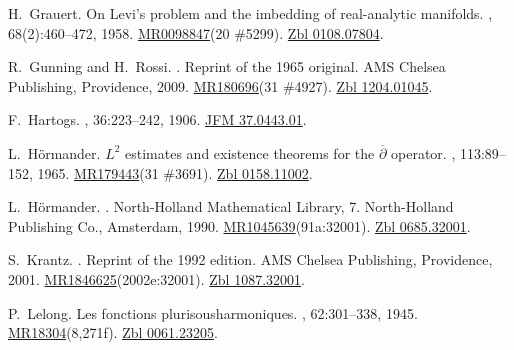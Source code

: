 \documentclass[11pt,a4paper, final, twoside]{article}
\numberwithin{equation}{section}
\begin{document}
\begin{thebibliography}{10}
H.~Grauert.
\newblock On {L}evi's problem and the imbedding of real-analytic manifolds.
, 68(2):460--472, 1958.
\newblock \href{http://www.ams.org/mathscinet-getitem?mr=0098847}{MR0098847}(20
  \#5299). \href{http://zbmath.org/?q=an:0108.07804}{Zbl 0108.07804}.

R.~Gunning and H.~Rossi.
.
\newblock Reprint of the 1965 original. AMS Chelsea Publishing, Providence,
  2009.
\newblock \href{http://www.ams.org/mathscinet-getitem?mr=180696}{MR180696}(31
  \#4927). \href{http://zbmath.org/?q=an:1204.01045}{Zbl 1204.01045}.

F.~Hartogs.
,
  36:223--242, 1906.
\newblock \href{http://zbmath.org/?q=an:37.0443.01}{JFM 37.0443.01}.

L.~H\"ormander.
\newblock ${L}^2$ estimates and existence theorems for the $\overline\partial$
  operator.
, 113:89--152, 1965.
\newblock \href{http://www.ams.org/mathscinet-getitem?mr=179443}{MR179443}(31
  \#3691). \href{http://zbmath.org/?q=an:0158.11002}{Zbl 0158.11002}.

L.~H{\"o}rmander.
.
\newblock North-Holland Mathematical Library, 7. North-Holland Publishing Co.,
  Amsterdam, 1990.
\newblock
  \href{http://www.ams.org/mathscinet-getitem?mr=1045639}{MR1045639}(91a:32001).
  \href{http://zbmath.org/?q=an:0685.32001}{Zbl 0685.32001}.

S.~Krantz.
.
\newblock Reprint of the 1992 edition. AMS Chelsea Publishing, Providence,
  2001.
\newblock
  \href{http://www.ams.org/mathscinet-getitem?mr=1846625}{MR1846625}(2002e:32001).
  \href{http://zbmath.org/?q=an:1087.32001}{Zbl 1087.32001}.

P.~Lelong.
\newblock Les fonctions plurisousharmoniques.
,
  62:301--338, 1945.
\newblock
  \href{http://www.ams.org/mathscinet-getitem?mr=18304}{MR18304}(8,271f).
  \href{http://zbmath.org/?q=an:0061.23205}{Zbl 0061.23205}.


\end{thebibliography}
\end{document}
